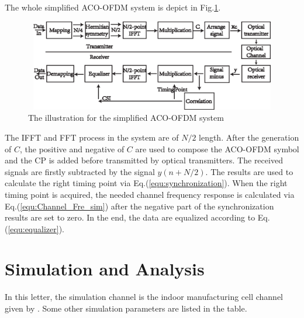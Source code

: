 \documentclass[journal]{IEEEtran}
\begin{document}
    The whole simplified ACO-OFDM system is depict in Fig.\ref{fig:sim_ACO_OFDM_system}.
    \begin{figure}[!htb]
    	\centering \includegraphics[width=12cm,height=4cm]{ACO_OFDM_system.eps}
		\caption{The illustration for the simplified ACO-OFDM system} \label{fig:sim_ACO_OFDM_system}
    \end{figure}
    The IFFT and FFT process in the system are of $ N/2 $ length. After the generation of $ C $, the positive and negative of $ C $ are used to compose the ACO-OFDM symbol and the CP is added before transmitted by optical transmitters. The received signals are firstly subtracted by the signal $ y(n+N/2) $. The results are used to calculate the right timing point via Eq.(\ref{equ:synchronization}). When the right timing point is acquired, the needed channel frequency response is calculated via Eq.(\ref{equ:Channel_Fre_sim}) after the negative part of the synchronization results are set to zero. In the end, the data are equalized according to Eq.(\ref{equ:equalizer}).



\section{Simulation and Analysis}
	In this letter, the simulation channel is the indoor manufacturing cell channel given by \cite{Uysal2015Lifi}. Some other simulation parameters are listed in the table.
\end{document}
